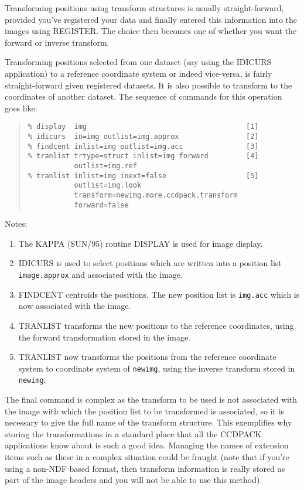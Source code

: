 \documentclass[twoside,11pt]{article}
\newcommand{\htmlref}[2]{#1}
\newcommand{\xref}[3]{#1}
\renewcommand{\_}{\texttt{\symbol{95}}}
\newenvironment{myquote}{\begin{quote}\begin{small}}{\end{small}\end{quote}}
\newcommand{\text}[1]{{\small \tt #1}}
\newcommand{\xroutine}[1]{\htmlref{{\sc #1}}{#1}}
\begin{document}
Transforming positions using transform structures is usually
straight-forward, provided you've registered your data and finally
entered this information into the images using \xroutine{REGISTER}. The
choice then becomes one of whether you want the forward or inverse
transform.

Transforming positions selected from one dataset (say using the \xroutine{IDICURS}
application) to a reference coordinate system or indeed vice-versa, is
fairly straight-forward given registered datasets. It is also possible
to transform to the coordinates of another dataset. The sequence of
commands for this operation goes like:
\begin{myquote}
\begin{verbatim}
% display  img                                      [1]
% idicurs  in=img outlist=img.approx                [2]
% findcent inlist=img outlist=img.acc               [3]
% tranlist trtype=struct inlist=img forward         [4]
           outlist=img.ref
% tranlist inlist=img inext=false                   [5]
           outlist=img.look
           transform=newimg.more.ccdpack.transform
           forward=false
\end{verbatim}
\end{myquote}

Notes:
\begin{enumerate}
\item The \xref{KAPPA (SUN/95)}{sun95}{} routine \xref{DISPLAY}{sun95}{DISPLAY}
is used for image display.
\item \xroutine{IDICURS} is used to select positions which are written into a
position list \text{image.approx} and associated with the image.
\item \xroutine{FINDCENT} centroids the positions. The new position list is
\text{img.acc} which is now associated with the image.
\item \xroutine{TRANLIST} transforms the new positions to the reference
coordinates, using the forward transformation stored in the image.
\item \xroutine{TRANLIST} now transforms the positions from the reference
coordinate system to coordinate system of \text{newimg}, using the
inverse transform stored in \text{newimg}.
\end{enumerate}

The final command is complex as the transform to be used is not
associated with the image with which the position list to be transformed
is associated, so it is necessary to give the full name of the
transform structure.
This exemplifies why storing the transformations in a standard place
that all the CCDPACK applications know about is such a good idea.
Managing the names of extension items such as these in a complex
situation could be fraught (note that if you're using a non-NDF based
format, then transform information is really stored as part of the
image headers and you will not be able to use this method).
\end{document}

